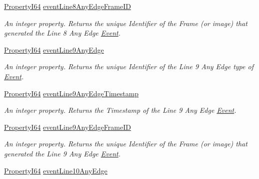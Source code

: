\begin{DoxyCompactItemize}
\hyperlink{group___common_interface_ga81749b2696755513663492664a18a893}{Property\+I64} \hyperlink{classmv_i_m_p_a_c_t_1_1acquire_1_1_gen_i_cam_1_1_event_control_acffb507d66c7247765308140685d7179}{event\+Line8\+Any\+Edge\+Frame\+I\+D}
\begin{DoxyCompactList}\small\item\em An integer property. Returns the unique Identifier of the Frame (or image) that generated the Line 8 Any Edge \hyperlink{classmv_i_m_p_a_c_t_1_1acquire_1_1_event}{Event}. \end{DoxyCompactList}\item 
\hyperlink{group___common_interface_ga81749b2696755513663492664a18a893}{Property\+I64} \hyperlink{classmv_i_m_p_a_c_t_1_1acquire_1_1_gen_i_cam_1_1_event_control_a411174311dd3be61f965cea761102388}{event\+Line9\+Any\+Edge}
\begin{DoxyCompactList}\small\item\em An integer property. Returns the unique Identifier of the Line 9 Any Edge type of \hyperlink{classmv_i_m_p_a_c_t_1_1acquire_1_1_event}{Event}. \end{DoxyCompactList}\item 
\hyperlink{group___common_interface_ga81749b2696755513663492664a18a893}{Property\+I64} \hyperlink{classmv_i_m_p_a_c_t_1_1acquire_1_1_gen_i_cam_1_1_event_control_a8dac353643c31e8f7639d9c344a4b6e3}{event\+Line9\+Any\+Edge\+Timestamp}
\begin{DoxyCompactList}\small\item\em An integer property. Returns the Timestamp of the Line 9 Any Edge \hyperlink{classmv_i_m_p_a_c_t_1_1acquire_1_1_event}{Event}. \end{DoxyCompactList}\item 
\hyperlink{group___common_interface_ga81749b2696755513663492664a18a893}{Property\+I64} \hyperlink{classmv_i_m_p_a_c_t_1_1acquire_1_1_gen_i_cam_1_1_event_control_a6054e9377f04b589407149daaf4b4be0}{event\+Line9\+Any\+Edge\+Frame\+I\+D}
\begin{DoxyCompactList}\small\item\em An integer property. Returns the unique Identifier of the Frame (or image) that generated the Line 9 Any Edge \hyperlink{classmv_i_m_p_a_c_t_1_1acquire_1_1_event}{Event}. \end{DoxyCompactList}\item 
\hyperlink{group___common_interface_ga81749b2696755513663492664a18a893}{Property\+I64} \hyperlink{classmv_i_m_p_a_c_t_1_1acquire_1_1_gen_i_cam_1_1_event_control_a1235b89ce22e9b1938d3593d537fc31b}{event\+Line10\+Any\+Edge}

\end{DoxyCompactItemize}
